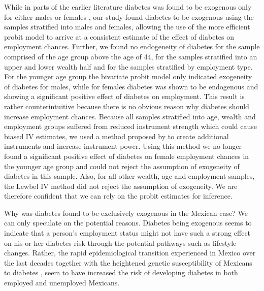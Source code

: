 While in parts of the earlier literature diabetes was found
to be exogenous only for either males or females \parencite{Brown2005,Latif2009},
our study found diabetes to be exogenous using the samples stratified
into males and females, allowing the use of the more efficient probit
model to arrive at a consistent estimate of the effect of diabetes
on employment chances. Further, we found no endogeneity of diabetes
for the sample comprised of the age group above the age of 44,  for
the samples stratified into an upper and lower wealth half and for
the samples stratified by employment type. For the younger age group
the bivariate probit model only indicated exogeneity of diabetes for
males, while for females diabetes was shown to be endogenous and showing
a significant positive effect of diabetes on employment. This result
is rather counterintuitive because there is no obvious reason why
diabetes should increase employment chances. Because all samples stratified
into age, wealth and employment groups suffered from reduced instrument
strength which could cause biased \ac{IV} estimates, we used a method
proposed by \textcite{Lewbel2012} to create additional instruments and
increase instrument power. Using this method we no longer found a
significant positive effect of diabetes on female employment chances
in the younger age group and could not reject the assumption of exogeneity
of diabetes in this sample. Also, for all other wealth, age and employment
samples, the Lewbel \ac{IV} method did not reject the assumption
of exogeneity. We are therefore confident that we can rely on the
probit estimates for inference.

Why was diabetes found to be exclusively exogenous in the Mexican
case? We can only speculate on the potential reasons. Diabetes being
exogenous seems to indicate that a person's employment status might
not have such a strong effect on his or her diabetes risk through
the potential pathways such as lifestyle changes. Rather, the rapid
epidemiological transition experienced in Mexico over the last decades
\parencite{Barquera2006,Barquera2008b,Rivera2002a} together with the
heightened genetic susceptibility of Mexicans to diabetes \parencite{Williams2013},
seem to have increased the risk of developing diabetes in both employed
and unemployed Mexicans.

